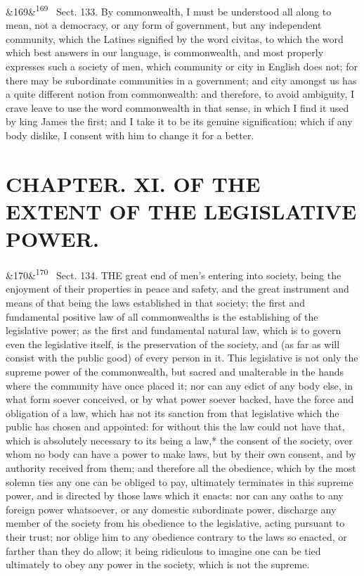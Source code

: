 \documentclass[12pt]{article}
\newcommand{\para}[1][]{\par\noindent\ifx&#1&\else\textsuperscript{\footnotesize #1}~\fi}
\begin{document}
\para[169] Sect. 133. By commonwealth, I must be understood all along to mean, not a democracy, or any form of government, but any independent community, which the Latines signified by the word civitas, to which the word which best answers in our language, is commonwealth, and most properly expresses such a society of men, which community or city in English does not; for there may be subordinate communities in a government; and city amongst us has a quite different notion from commonwealth: and therefore, to avoid ambiguity, I crave leave to use the word commonwealth in that sense, in which I find it used by king James the first; and I take it to be its genuine signification; which if any body dislike, I consent with him to change it for a better.

\section*{CHAPTER. XI. OF THE EXTENT OF THE LEGISLATIVE POWER.}

\para[170] Sect. 134. THE great end of men's entering into society, being the enjoyment of their properties in peace and safety, and the great instrument and means of that being the laws established in that society; the first and fundamental positive law of all commonwealths is the establishing of the legislative power; as the first and fundamental natural law, which is to govern even the legislative itself, is the preservation of the society, and (as far as will consist with the public good) of every person in it. This legislative is not only the supreme power of the commonwealth, but sacred and unalterable in the hands where the community have once placed it; nor can any edict of any body else, in what form soever conceived, or by what power soever backed, have the force and obligation of a law, which has not its sanction from that legislative which the public has chosen and appointed: for without this the law could not have that, which is absolutely necessary to its being a law,* the consent of the society, over whom no body can have a power to make laws, but by their own consent, and by authority received from them; and therefore all the obedience, which by the most solemn ties any one can be obliged to pay, ultimately terminates in this supreme power, and is directed by those laws which it enacts: nor can any oaths to any foreign power whatsoever, or any domestic subordinate power, discharge any member of the society from his obedience to the legislative, acting pursuant to their trust; nor oblige him to any obedience contrary to the laws so enacted, or farther than they do allow; it being ridiculous to imagine one can be tied ultimately to obey any power in the society, which is not the supreme.
\end{document}
